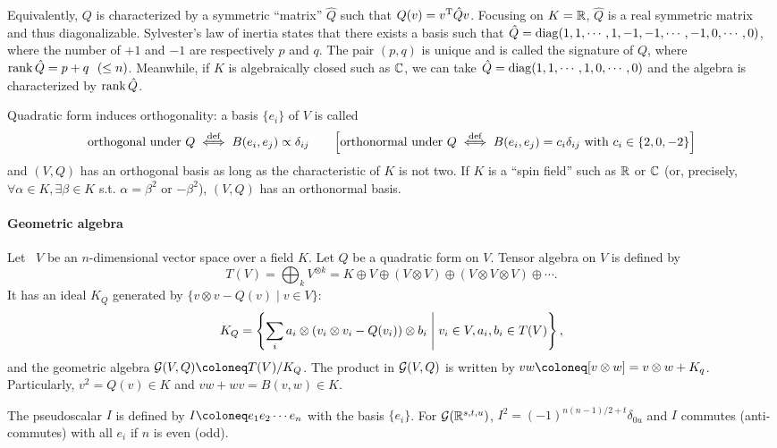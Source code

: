 \documentclass[CheatSheet]{subfiles}
\begin{document}
Equivalently, $Q$ is characterized by a symmetric ``matrix'' $\hat Q$ such that $Q(v)=v^{\mathrm{T}} \hat Q v$.
Focusing on $K={\mathbb{R}}$, $\hat Q$ is a real symmetric matrix and thus diagonalizable. Sylvester's law of inertia states that there exists a basis such that $\hat Q=\operatorname{\mathrm{diag}}(1,1,\cdots,1,-1,-1,\cdots,-1,0,\cdots,0)$, where the number of $+1$ and $-1$ are respectively $p$ and $q$.
The pair $(p,q)$ is unique and is called the signature of $Q$, where $\operatorname{\mathrm{rank}} \hat Q=p+q~~(\le n)$.
Meanwhile, if $K$ is algebraically closed such as ${\mathbb{C}}$, we can take $\hat Q=\operatorname{\mathrm{diag}}(1,1,\cdots,1,0,\cdots,0)$ and the algebra is characterized by $\operatorname{\mathrm{rank}}\hat Q$.


Quadratic form induces orthogonality: a basis $\{e_i\}$ of $V$ is called
\begin{equation}
  \text{orthogonal under $Q$}\stackrel{\text{def}}\iff B(e_i,e_j)\propto \delta_{ij}\qquad
  \Bigl[\text{orthonormal under $Q$}\stackrel{\text{def}}\iff B(e_i,e_j)=c_i\delta_{ij}\text{~with~}c_i\in\{2,0,-2\}\Bigr]
\end{equation}
and $(V,Q)$ has an orthogonal basis as long as the characteristic of $K$ is not two.
If $K$ is a ``spin field'' such as ${\mathbb{R}}$ or ${\mathbb{C}}$ (or, precisely, $\forall \alpha\in K,\exists \beta\in K$ s.t. $\alpha=\beta^2$ or $-\beta^2$), $(V,Q)$ has an orthonormal basis.

\paragraph{Geometric algebra}
Let~\cite{Lundholm:2009xd} $V$ be an $n$-dimensional vector space over a field $K$. Let $Q$ be a quadratic form on $V$.
Tensor algebra on $V$ is defined by
\begin{equation}
  T(V) = \bigoplus_{k} V^{\otimes k}
       = K\oplus V\oplus (V\otimes V)\oplus(V\otimes V\otimes V)\oplus\cdots.
\end{equation}
It has an ideal $K_Q$ generated by $\{v\otimes v - Q(v)\mid v\in V\}$:
\begin{equation}
  K_Q = \left\{\sum_{i} a_i\otimes(v_i\otimes v_i-Q(v_i))\otimes b_i\mathrel{}\middle|\mathrel{} v_i\in V, a_i,b_i \in T(V)\right\},
\end{equation}
and the geometric algebra $\GeoA(V,Q)\deq T(V)/K_Q$.
The product in $\operatorname{\mathcal{G}}(V,Q)$ is written by $vw \deq [v\otimes w]=v\otimes w+K_q$. Particularly, $v^2 = Q(v)\in K$ and $vw+wv=B(v,w)\in K$.

The pseudoscalar $I$ is defined by $I\deq e_1e_2\cdots e_n$ with the basis $\{e_i\}$. For $\operatorname{\mathcal{G}}({\mathbb{R}}^{s,t,u})$, $I^2=(-1)^{n(n-1)/2+t}\delta_{0u}$ and $I$ commutes (anti-commutes) with all $e_i$ if $n$ is even (odd).
\end{document}
